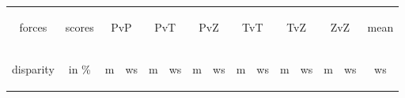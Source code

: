 \setlength{\tabcolsep}{6pt}
\begin{table}[h]
\begin{center}
\begin{small}
\begin{tabular}{|c|c|cc|cc|cc|cc|cc|cc|c|}%
\hline
\begin{footnotesize}forces\end{footnotesize} & scores & \multicolumn{2}{|c|}{PvP} & \multicolumn{2}{|c|}{PvT} & \multicolumn{2}{|c|}{PvZ} & \multicolumn{2}{|c|}{TvT} & \multicolumn{2}{|c|}{TvZ} & \multicolumn{2}{|c|}{ZvZ} & mean \\%
\begin{footnotesize}disparity\end{footnotesize} & in \% & m & ws & m & ws & m & ws & m & ws & m & ws& m & ws & ws\\
\hline


\end{tabular}
\end{small}
\end{center}
\end{table}
